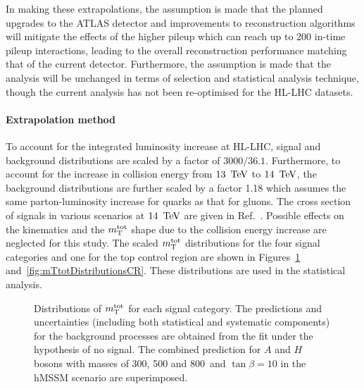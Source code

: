 In making these extrapolations, the assumption is made that the planned upgrades to the ATLAS detector and
improvements to reconstruction algorithms will mitigate the effects of the higher pileup which can reach up
to 200 in-time pileup interactions, leading to the overall reconstruction performance matching that of the current detector.
Furthermore, the assumption is made that the analysis will be unchanged in terms of selection and
statistical analysis technique, though the current analysis has not been re-optimised for the HL-LHC datasets.

\paragraph{Extrapolation method}
\label{sec:extrapolation method}
To account for the integrated luminosity increase at HL-LHC, signal and background distributions are scaled by
a factor of $3000/36.1$. Furthermore, to account for the increase in collision energy from $13~\,\text{Te\hspace{-.08em}V}$
to $14~\,\text{Te\hspace{-.08em}V}$, the background distributions are further scaled by a factor 1.18 which assumes the same
parton-luminosity increase for quarks as that for gluons. The cross section of signals in various scenarios
at $14~\,\text{Te\hspace{-.08em}V}$ are given in Ref.~\cite{deFlorian:2016spz}. Possible effects on the kinematics and the $m_\textnormal{T}^\textnormal{tot}$
shape due to the collision energy increase are neglected for this study. The scaled $m_\textnormal{T}^\textnormal{tot}$ distributions
for the four signal categories and one for the top control region are shown in
Figures~\ref{fig:mTtotDistributionsSR} and~\ref{fig:mTtotDistributionsCR}. These distributions are used in
the statistical analysis.

\begin{figure}[!ht]
    \centering
        \qquad
        \qquad
        \qquad
        \caption{Distributions of $m_\textnormal{T}^\textnormal{tot}$ for each signal category. The predictions and uncertainties (including both statistical and systematic components) for the background processes are obtained from the fit under the hypothesis of no signal. The combined prediction for $A$ and $H$ bosons with masses of 300, 500 and 800~\GeV and $\tan\beta= 10$ in the hMSSM scenario are superimposed. }

    \label{fig:mTtotDistributionsSR}
\end{figure}

